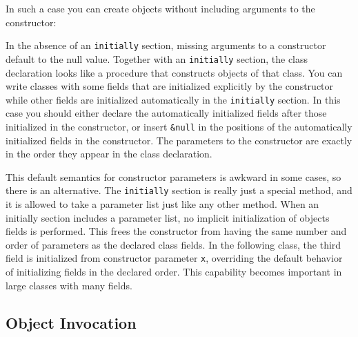 
\noindent
In such a case you can create objects without including arguments to the
constructor: 


In the absence of an \texttt{initially} section, missing arguments to a
constructor default to the null value. Together with an
\texttt{initially} section, the class declaration looks like a
procedure that constructs objects of that class. You can
write classes with some fields that are initialized explicitly by the
constructor while other fields are initialized automatically in the
\texttt{initially} section. In this case you should either declare the
automatically initialized fields after those initialized in
the constructor, or insert \texttt{\&null} in the positions of the
automatically initialized fields in the constructor. The parameters to
the constructor are exactly in the order they appear in the class
declaration.

This default semantics for constructor parameters is awkward in some
cases, so there is an alternative. The \texttt{initially} section is
really just a special method, and it is allowed to take a parameter
list just like any other method. When an initially section includes a
parameter list, no implicit initialization of objects{\textquotesingle}
fields is performed. This frees the constructor from having the same
number and order of parameters as the declared class fields. In the
following class, the third field is initialized from constructor
parameter \texttt{x}, overriding the default behavior of initializing
fields in the declared order. This capability becomes important in
large classes with many fields.


\subsection{Object Invocation}

